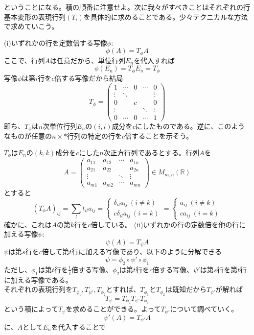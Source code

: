\documentclass[dvipdfmx]{jsarticle}
\begin{document}
ということになる。積の順番に注意せよ。次に我々がすべきことはそれぞれの行基本変形の表現行列$(T_i)$を具体的に求めることである。少々テクニカルな方法で求めていこう。\\\par
(i)いずれかの行を定数倍する写像$\phi:$
\[\phi(A)=T_\phi A\]
ここで、行列$A$は任意だから、単位行列$E_n$を代入すれば
\[\phi(E_n)=T_\phi E_n=T_\phi\]
写像$\phi$は第$i$行を$c$倍する写像だから結局
\[T_\phi=\begin{pmatrix}1&\cdots&0&\cdots&0\\\vdots&\ddots&{}&{}&\vdots\\0&{}&c&{}&0\\\vdots&{}&{}&\ddots&\vdots\\0&\cdots&0&\cdots&1\end{pmatrix}\]
即ち、$T_\phi$は$n$次単位行列$E_n$の$(i,i)$成分を$c$にしたものである。逆に、このようなものが任意の$n \times \ast$行列の特定の行を$c$倍することを示そう。\par
$T_\phi$は$E_n$の$(k,k)$成分を$c$にした$n$次正方行列であるとする。行列$A$を
\[A=\begin{pmatrix}a_{11}&a_{12}&\cdots&a_{1n}\\a_{21}&a_{22}&{}&a_{2n}\\\vdots&{}&\ddots&\vdots\\a_{m1}&a_{m2}&\cdots&a_{mn}\end{pmatrix} \in M_{m,n}(\mathbb{R})\]
とすると
\[(T_\phi A)_{ij}=\sum_lt_{il}a_{lj}=\begin{cases}\delta_{il}a_{lj}~(i \neq k)\\c\delta_{il}a_{lj}~(i=k)\end{cases}=\begin{cases}a_{ij}~(i \neq k)\\ca_{ij}~(i=k)\end{cases}\]
確かに、これは$A$の第$k$行を$c$倍している。\newpage
(ii)いずれかの行の定数倍を他の行に加える写像$\psi:$
\[\psi(A)=T_\psi A\]
$\psi$は第$s$行を$c$倍して第$t$行に加える写像であり、以下のように分解できる
\[\psi=\phi_2\circ\psi'\circ\phi_1\]
ただし、$\phi_1$は第$t$行を$\displaystyle\frac{1}{c}$倍する写像、$\phi_2$は第$t$行を$c$倍する写像、$\psi'$は第$s$行を第$t$行に加える写像である。\\
それぞれの表現行列を$T_{\phi_1},T_{\psi'},T_{\phi_2}$とすれば、$T_{\phi_1}$と$T_{\phi_2}$は既知だから$T_{\psi'}$が解れば
\[T_\psi=T_{\phi_2}T_{\psi'}T_{\phi_1}\]
という積によって$T_\psi$を求めることができる。よって$T_{\psi'}$について調べていく。
\[\psi'(A)=T_{\psi'}A\]
に、$A$として$E_n$を代入することで
\end{document}
